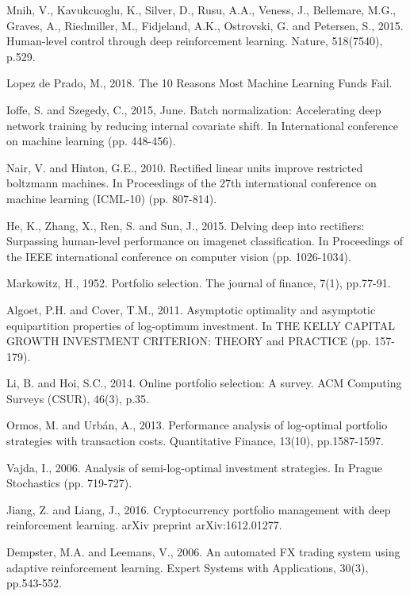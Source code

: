 \documentclass{gapd}
\begin{document}
\noindent[4] Mnih, V., Kavukcuoglu, K., Silver, D., Rusu, A.A., Veness, J., Bellemare, M.G., Graves, A., Riedmiller, M., Fidjeland, A.K., Ostrovski, G. and Petersen, S., 2015. Human-level control through deep reinforcement learning. Nature, 518(7540), p.529.

\noindent[5] Lopez de Prado, M., 2018. The 10 Reasons Most Machine Learning Funds Fail.

\noindent[6] Ioffe, S. and Szegedy, C., 2015, June. Batch normalization: Accelerating deep network training by reducing internal covariate shift. In International conference on machine learning (pp. 448-456).

\noindent[7] Nair, V. and Hinton, G.E., 2010. Rectified linear units improve restricted boltzmann machines. In Proceedings of the 27th international conference on machine learning (ICML-10) (pp. 807-814).

\noindent[8] He, K., Zhang, X., Ren, S. and Sun, J., 2015. Delving deep into rectifiers: Surpassing human-level performance on imagenet classification. In Proceedings of the IEEE international conference on computer vision (pp. 1026-1034).

\noindent[9] Markowitz, H., 1952. Portfolio selection. The journal of finance, 7(1), pp.77-91.

\noindent[10] Algoet, P.H. and Cover, T.M., 2011. Asymptotic optimality and asymptotic equipartition properties of log-optimum investment. In THE KELLY CAPITAL GROWTH INVESTMENT CRITERION: THEORY and PRACTICE (pp. 157-179).

\noindent[11] Li, B. and Hoi, S.C., 2014. Online portfolio selection: A survey. ACM Computing Surveys (CSUR), 46(3), p.35.

\noindent[12] Ormos, M. and Urbán, A., 2013. Performance analysis of log-optimal portfolio strategies with transaction costs. Quantitative Finance, 13(10), pp.1587-1597.

\noindent[13] Vajda, I., 2006. Analysis of semi-log-optimal investment strategies. In Prague Stochastics (pp. 719-727).

\noindent[14] Jiang, Z. and Liang, J., 2016. Cryptocurrency portfolio management with deep reinforcement learning. arXiv preprint arXiv:1612.01277.

\noindent[15] Dempster, M.A. and Leemans, V., 2006. An automated FX trading system using adaptive reinforcement learning. Expert Systems with Applications, 30(3), pp.543-552.


\onecolumn
\newpage
\end{document}
